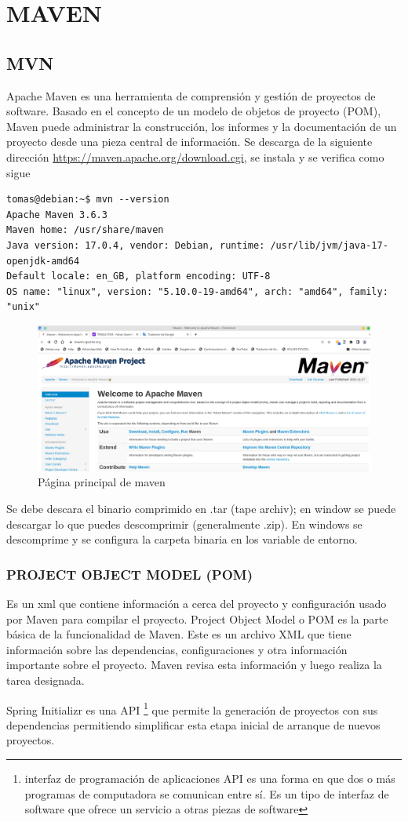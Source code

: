 \chapter*{MAVEN}
\section{MVN}
Apache Maven es una herramienta de comprensión y gestión de proyectos de software. Basado en el concepto de un modelo de objetos de proyecto (POM), Maven puede administrar la construcción, los informes y la documentación de un proyecto desde una pieza central de información. Se descarga de la siguiente dirección  \url{https://maven.apache.org/download.cgi}, se instala y se verifica como sigue
\begin{verbatim}
tomas@debian:~$ mvn --version
Apache Maven 3.6.3
Maven home: /usr/share/maven
Java version: 17.0.4, vendor: Debian, runtime: /usr/lib/jvm/java-17-openjdk-amd64
Default locale: en_GB, platform encoding: UTF-8
OS name: "linux", version: "5.10.0-19-amd64", arch: "amd64", family: "unix"
\end{verbatim}
\begin{figure}[h]
\centering
\includegraphics[scale=0.4]{images/maven1}
\caption{Página principal de maven}
\end{figure}
Se debe descara el binario comprimido en .tar (tape archiv); en window se puede descargar lo que puedes descomprimir (generalmente .zip). En windows se descomprime y se configura la carpeta binaria en los variable de entorno. 
\subsection{PROJECT OBJECT MODEL (POM)}
Es un xml  que contiene información a cerca del proyecto y configuración usado por Maven para compilar el proyecto. Project Object Model o POM es la parte básica de la funcionalidad de Maven. Este es un archivo XML que tiene información sobre las dependencias, configuraciones y otra información importante sobre el proyecto. Maven revisa esta información y luego realiza la tarea designada.

Spring Initializr es una API \footnote{ interfaz de programación de aplicaciones API es una forma en que dos o más programas de computadora se comunican entre sí. Es un tipo de interfaz de software que ofrece un servicio a otras piezas de software} que permite la generación de proyectos con sus dependencias permitiendo simplificar esta etapa inicial de arranque de nuevos proyectos. 